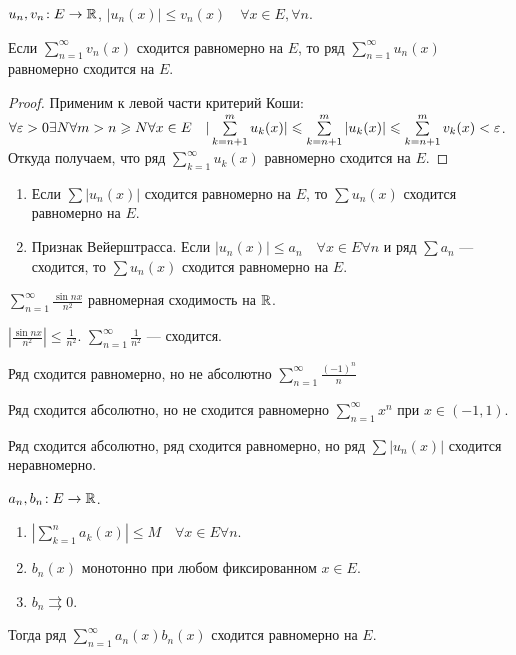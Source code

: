 \begin{theorem}
   $u_n, v_n\!: E \to \mathbb{R}$,  $|u_n(x)| \le v_n(x) \quad \forall x \in E, \forall n$.

   Если $\sum\limits_{n=1}^\infty v_n(x)$ сходится равномерно на  $E$, то ряд  $\sum\limits_{n=1}^\infty u_n(x)$ равномерно сходится на  $E$.
\end{theorem}
\begin{proof}
    Применим к левой части критерий Коши: $\forall \varepsilon > 0 \exists N \forall m > n \geqslant N \forall x \in E \quad |\sum\limits_{k=n+1}^m u_k(x)| \leqslant \sum\limits_{k=n+1}^m |u_k(x)|\leqslant \sum\limits_{k=n+1}^m v_k(x)< \varepsilon$. Откуда получаем, что ряд $\sum\limits_{k=1}^\infty u_k(x) $ равномерно сходится на  $E$.
\end{proof}
\begin{consequence}
    \begin{enumerate}
        \item Если $\sum |u_n(x)|$ сходится равномерно на  $E$, то  $\sum u_n(x)$ сходится равномерно на  $E$. 
        \item Признак Вейерштрасса. Если  $|u_n(x)| \le a_n \quad \forall x \in E \forall n$ и ряд $\sum a_n$ --- сходится, то  $\sum u_n(x)$ сходится равномерно на  $E$.
    \end{enumerate}
\end{consequence}
\begin{example}
    $\sum\limits_{n=1}^\infty \frac{\sin nx}{n^2}$ равномерная сходимость на $\mathbb{R}$.

     $\left| \frac{\sin nx}{n^2}\right| \le \frac{1}{n^2}$. $\sum\limits_{n=1}^\infty \frac{1}{n^2}$ --- сходится.
\end{example}
\begin{remark}
    Ряд сходится равномерно, но не абсолютно $\sum\limits_{n=1}^\infty \frac{(-1)^n}{n}$

    Ряд сходится абсолютно, но не сходится равномерно $\sum\limits_{n=1}^\infty x^n$ при $x \in (-1, 1)$.

    Ряд сходится абсолютно, ряд сходится равномерно, но ряд $\sum |u_n(x)|$ сходится неравномерно.
\end{remark}
\begin{theorem}
    $a_n, b_n\!: E \to \mathbb{R}$.
     \begin{enumerate}
         \item $\left|\sum\limits_{k=1}^n a_k(x)\right| \le M \quad \forall x \in E \forall n$.
         \item $b_n(x)$ монотонно при любом фиксированном $x \in E$.
         \item  $b_n \rightrightarrows 0$.
    \end{enumerate}

    Тогда ряд $\sum\limits_{n=1}^\infty a_n(x)b_n(x)$ сходится равномерно на  $E$.
\end{theorem}
